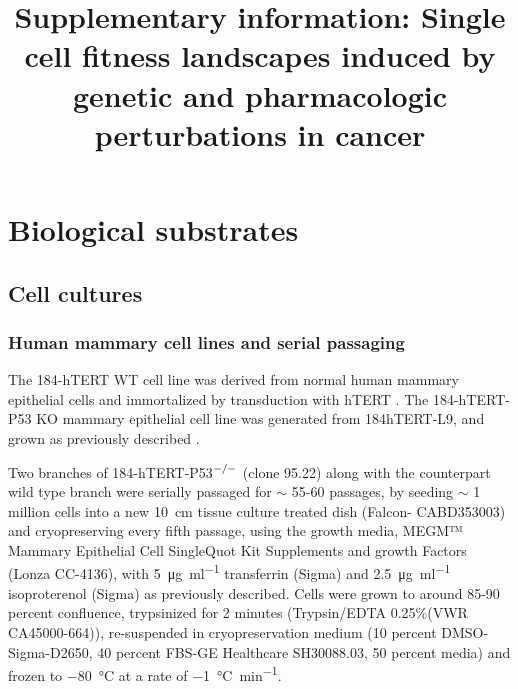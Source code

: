\documentclass{article}
\title{Supplementary information: \newline Single cell fitness landscapes induced by genetic and pharmacologic perturbations in cancer}
\begin{document}
\maketitle


\tableofcontents

\renewcommand{\thefigure}{S\arabic{figure}}
\setcounter{figure}{0}

\section{Biological substrates} 
\subsection{Cell cultures}
\subsubsection{Human mammary cell lines and serial passaging}
The 184-hTERT WT cell line was derived from normal human mammary epithelial cells and immortalized by transduction with hTERT \cite{stampfer2003human}.
The 184-hTERT-P53 KO mammary epithelial cell line was generated from 184hTERT-L9, and grown as previously described \cite{laks2019clonal,burleigh2015co}. 

Two branches of 184-hTERT-P53$^{\small{-/-}}$ (clone 95.22) along with the counterpart wild type branch were serially passaged for $\sim$ 55-60 passages, by seeding $\sim$ 1 million cells into a new \SI{10}{\cm} tissue culture treated dish (Falcon- CABD353003) and cryopreserving every fifth passage,
using the growth media, MEGM™ Mammary Epithelial Cell SingleQuot Kit Supplements and growth Factors (Lonza CC-4136), 
with \SI{5}{\ug\per\ml} transferrin (Sigma) and \SI{2.5}{\ug\per\ml} isoproterenol (Sigma) as previously described. Cells were grown to around 85-90 percent confluence, 
trypsinized for 2 minutes (Trypsin/EDTA 0.25\%(VWR CA45000-664)),
re-suspended in cryopreservation medium (10 percent DMSO-Sigma-D2650,
40 percent FBS-GE Healthcare SH30088.03, 50 percent media) and frozen
to \SI{-80}{\degreeCelsius} at a rate of
\SI{-1}{\degreeCelsius\per\minute}. 
\end{document}
